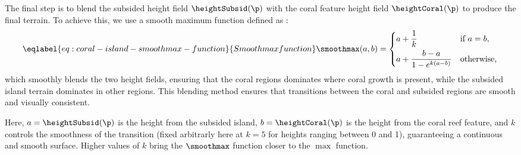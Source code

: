 
The final step is to blend the subsided height field $\heightSubsid(\p)$ with the coral feature height field $\heightCoral(\p)$ to produce the final terrain. To achieve this, we use a smooth maximum function defined as : 
\begin{align}
    \eqlabel{eq:coral-island-smoothmax-function}{Smoothmax function}
    \smoothmax(a, b) = \begin{dcases}
        a + \frac{1}{k} & \text{if } a = b, \\
        a + \frac{b - a}{1 - e^{k(a-b)}} & \text{otherwise,}
    \end{dcases}
\end{align}
which smoothly blends the two height fields, ensuring that the coral regions dominates where coral growth is present, while the subsided island terrain dominates in other regions. This blending method ensures that transitions between the coral and subsided regions are smooth and visually consistent.


Here, $a = \heightSubsid(\p)$ is the height from the subsided island, $b = \heightCoral(\p)$ is the height from the coral reef feature, and $k$ controls the smoothness of the transition (fixed arbitrarly here at $k=5$ for heights ranging between 0 and 1), guaranteeing a continuous and smooth surface. Higher values of $k$ bring the $\smoothmax$ function closer to the $\max$ function.



